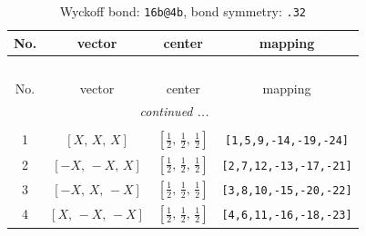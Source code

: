 \documentclass[fleqn,8pt]{jsarticle}
\begin{document}
\renewcommand{\arraystretch}{1.2}
\begin{longtable}{cccc}
\caption{Wyckoff bond: {\tt 16b@4b}, bond symmetry: {\tt .32}}
 \\
 \hline \hline
No. & vector & center & mapping \\ \hline \endfirsthead

\multicolumn{3}{l}{\tablename\ \thetable{}} \\
 \hline \hline
No. & vector & center & mapping \\ \hline \endhead

 \hline \hline
\multicolumn{3}{r}{\footnotesize\it continued ...} \\ \endfoot

 \hline \hline
\multicolumn{3}{r}{} \\ \endlastfoot

1 & $\left[ X,\, X,\, X \right]$ & $\left[ \frac{1}{2},\, \frac{1}{2},\, \frac{1}{2} \right]$ & {\tt [1,5,9,-14,-19,-24]} \\ \hline
2 & $\left[ - X,\, - X,\, X \right]$ & $\left[ \frac{1}{2},\, \frac{1}{2},\, \frac{1}{2} \right]$ & {\tt [2,7,12,-13,-17,-21]} \\ \hline
3 & $\left[ - X,\, X,\, - X \right]$ & $\left[ \frac{1}{2},\, \frac{1}{2},\, \frac{1}{2} \right]$ & {\tt [3,8,10,-15,-20,-22]} \\ \hline
4 & $\left[ X,\, - X,\, - X \right]$ & $\left[ \frac{1}{2},\, \frac{1}{2},\, \frac{1}{2} \right]$ & {\tt [4,6,11,-16,-18,-23]} \\
\end{longtable}
\renewcommand{\arraystretch}{1.2}
\end{document}
